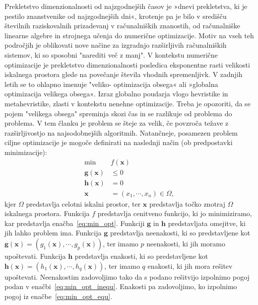 Prekletstvo dimenzionalnosti od najzgodnejših časov je »dnevi prekletstva, ki je pestilo znanstvenike od najzgodnejših dni«, krotenje pa je bilo v središču številnih raziskovalnih prizadevanj v računalniških znanostih, od računalniške linearne algebre in strojnega učenja do numerične optimizacije.
Motiv na vseh teh področjih je oblikovati nove načine za izgradnjo razširljivih računalniških sistemov, ki so sposobni "narediti več z manj".
V kontekstu numerične optimizacije je prekletstvo dimenzionalnosti posledica eksponentne rasti velikosti iskalnega prostora glede na povečanje števila vhodnih spremenljivk.
V zadnjih letih se to ohlapno imenuje "veliko- optimizacija obsega« ali »globalna optimizacija velikega obsega«.
Izraz globalno poudarja vlogo hevristike in metahevristike, zlasti v kontekstu nenehne optimizacije.
Treba je opozoriti, da se pojem "velikega obsega" spreminja skozi čas in se razlikuje od problema do problema.
V tem članku je problem se šteje za velik, če povzroča težave z razširljivostjo na najsodobnejših algoritmih.
Natančneje, posamezen problem ciljne optimizacije je mogoče definirati na naslednji način (ob predpostavki minimizacije):
\begin{align}
	\min&{f(\mathbf{x})} \label{eq:min_opt}\\
	\mathbf{g}(\mathbf{x}) &\leq 0 \label{eq:min_opt_inequ}\\
	\mathbf{h}(\mathbf{x}) &= 0 \label{eq:min_opt_equ}\\
	\mathbf{x} &= (x_1, \cdots, x_n) \in \Omega \label{eq:min_opt_space},
\end{align}
kjer $\Omega$ predstavlja celotni iskalni prostor, ter $\mathbf{x}$ predstavlja točko znotraj $\Omega$ iskalnega prostora.
Funkcija $f$ predstavlja cenitveno funkcijo, ki jo minimiziramo, kar predstavlja enačba~\ref{eq:min_opt}.
Funkciji $\mathbf{g}$ in $\mathbf{h}$ predstavljata omejitve, ki jih lahko problem ima.
Funkcija $\mathbf{g}$ predstavlja neenakosti, ki so predstavljene kot $\mathbf{g}(\mathbf{x}) = (g_1(\mathbf{x}), \cdots, g_p(\mathbf{x}))$, ter imamo $p$ neenakosti, ki jih moramo upoštevati.
Funkcija $\mathbf{h}$ predstavlja enakosti, ki so predstavljene kot $\mathbf{h}(\mathbf{x}) = (h_1(\mathbf{x}), \cdots, h_q(\mathbf{x}))$, ter imamo $q$ enakosti, ki jih mora rešitev upoštevati.
Neenakostim zadovoljimo tako da s podano rešitvijo izpolnimo pogoj podan v enačbi~\ref{eq:min_opt_inequ}.
Enakosti pa zadovoljimo, ko izpolnimo pogoj iz enačbe~\ref{eq:min_opt_equ}.


